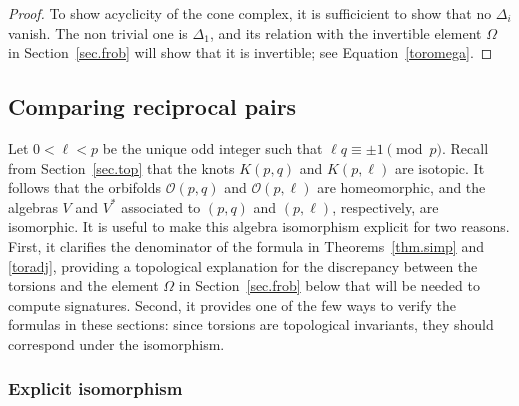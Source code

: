 \documentclass{amsart}
\newcommand{\calO}{\mathcal{O}}
\theoremstyle{definition}
\begin{document}
\begin{proof}
To show acyclicity of the cone complex, it is sufficicient to show that no $\Delta_i$ vanish. The non trivial one is $\Delta_1$, and its relation with the invertible element $\Omega$ in Section~\ref{sec.frob} will show that it is invertible; see Equation~\eqref{toromega}. 
\end{proof}

\subsection{Comparing reciprocal pairs}
\label{sec.dual}

Let $0<\ell<p$ be the unique odd integer such that $\ell q\equiv\pm 1 \pmod{p}$. Recall from Section~\ref{sec.top} that  the knots $K(p,q)$ and $K(p,\ell)$ are isotopic. It follows that the orbifolds $\calO(p,q)$ and $\calO(p,\ell)$ are homeomorphic, and the algebras $V$ and $V^\ast$ associated to $(p,q)$ and $(p,\ell)$, respectively, are isomorphic.
It is useful to make this algebra isomorphism explicit for two reasons. First, it clarifies the denominator of the formula in Theorems~\ref{thm.simp} and \ref{toradj}, providing a topological explanation for the discrepancy between the torsions and the element $\Omega$ in Section~\ref{sec.frob} below that will be needed to compute signatures. Second, it provides one of the few ways to verify the formulas in these sections: since  torsions are topological invariants, they should correspond under the isomorphism. 

\subsubsection{Explicit isomorphism}
\end{document}
